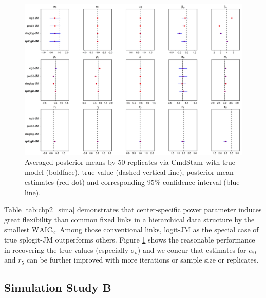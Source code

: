 \begin{figure}[H]
\centering
\includegraphics[width=\textwidth]{Figures/Chp2_SIM_SPLOGIT_A.jpg}
\caption{Averaged posterior means by 50 replicates via CmdStanr with true model (boldface), true value (dashed vertical line), posterior mean estimates (red dot) and corresponding 95\% confidence interval (blue line).}
\label{fig:chp2_sima}
\end{figure}

Table \ref{tab:chp2_sima} demonstrates that center-specific power parameter induces great flexibility than common fixed links in a hierarchical data structure by the smallest $\mbox{WAIC}_2$. Among those conventional links, logit-JM as the special case of true splogit-JM outperforms others. Figure \ref{fig:chp2_sima} shows the reasonable performance in recovering the true values (especially $\sigma_b$) and we concur that estimates for $\alpha_0$ and $r_5$ can be further improved with more iterations or sample size or replicates.   

\subsection{Simulation Study B} 

